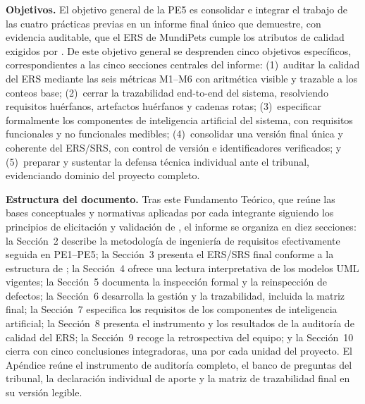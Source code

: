 \documentclass[12pt,a4paper]{article}
\begin{document}
\textbf{Objetivos.} El objetivo general de la PE5 es consolidar e integrar el
trabajo de las cuatro prácticas previas en un informe final único que demuestre,
con evidencia auditable, que el ERS de MundiPets cumple los atributos de calidad
exigidos por \citep{ieee29148}. De este objetivo general se desprenden cinco
objetivos específicos, correspondientes a las cinco secciones centrales del
informe: (1)~auditar la calidad del ERS mediante las seis métricas M1--M6 con
aritmética visible y trazable a los conteos base; (2)~cerrar la trazabilidad
end-to-end del sistema, resolviendo requisitos huérfanos, artefactos huérfanos y
cadenas rotas; (3)~especificar formalmente los componentes de inteligencia
artificial del sistema, con requisitos funcionales y no funcionales medibles;
(4)~consolidar una versión final única y coherente del ERS/SRS, con control de
versión e identificadores verificados; y (5)~preparar y sustentar la defensa
técnica individual ante el tribunal, evidenciando dominio del proyecto completo.

\textbf{Estructura del documento.} Tras este Fundamento Teórico, que reúne las
bases conceptuales y normativas aplicadas por cada integrante siguiendo los
principios de elicitación y validación de \citep{pohl2025}, el informe se organiza
en diez secciones: la Sección~2 describe la metodología de ingeniería de
requisitos efectivamente seguida en PE1--PE5; la Sección~3 presenta el ERS/SRS
final conforme a la estructura de \citep{ieee29148}; la Sección~4 ofrece una
lectura interpretativa de los modelos UML vigentes; la Sección~5 documenta la
inspección formal y la reinspección de defectos; la Sección~6 desarrolla la
gestión y la trazabilidad, incluida la matriz final; la Sección~7 especifica los
requisitos de los componentes de inteligencia artificial; la Sección~8 presenta
el instrumento y los resultados de la auditoría de calidad del ERS; la
Sección~9 recoge la retrospectiva del equipo; y la Sección~10 cierra con cinco
conclusiones integradoras, una por cada unidad del proyecto. El Apéndice reúne el
instrumento de auditoría completo, el banco de preguntas del tribunal, la
declaración individual de aporte y la matriz de trazabilidad final en su versión
legible.


\end{document}
